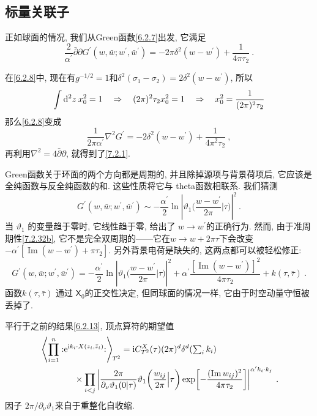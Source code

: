 \subsection*{标量关联子} 
正如球面的情况, 我们从Green函数\eqref{6.2.7}出发, 它满足
\begin{equation}
	\frac{2}{\alpha^{\prime}} \bar{\partial} \partial G^{\prime}(w, \bar{w} ; w^{\prime}, \bar{w}^{\prime})
	=-2 \pi \delta^{2}(w-w^{\prime})+\frac{1}{4 \pi \tau_{2}} \:. \label{7.2.1}
\end{equation}
\begin{tcolorbox}
	\begin{remark}
		在\eqref{6.2.8}中, 现在有$g^{-1/2}=1$和$ \delta^{2}(\sigma_{1}-\sigma_{2})=2 \delta^{2}(w-w^{\prime})$, 所以
		\[
			\int \mathrm{d}^{2} z\: x_{0}^{2}=1 \quad \Rightarrow \quad (2 \pi)^{2} \tau_{2} x_{0}^{2}=1 \quad \Rightarrow \quad 
			 x_{0}^{2}=\frac{1}{(2 \pi)^{2} \tau_{2}}
		\]
		那么\eqref{6.2.8}变成
		\[
			\frac{1}{2 \pi \alpha^{\prime}} \nabla^{2} G^{\prime} =-2 \delta^{2}(w-w^{\prime})+\frac{1}{4 \pi^{2} \tau_{2}} \:,
		\]
		再利用$\nabla^{2}=4\bar{\partial} \partial$, 就得到了\eqref{7.2.1}.
	\end{remark}
\end{tcolorbox}
\noindent Green函数关于环面的两个方向都是周期的, 并且除掉源项与背景荷项后, 它应该是全纯函数与反全纯函数的和. 这些性质将它与 theta函数相联系. 我们猜测 
\begin{equation}
	G^{\prime}(w, \bar{w} ; w^{\prime}, \bar{w}^{\prime}) \sim-\frac{\alpha^{\prime}}{2}
	\ln \left|\vartheta_{1}\biggl(\frac{w-w^{\prime}}{2 \pi} \Big\vert \tau\biggr)\right|^{2} \:. \label{7.2.2}
\end{equation}
当 $\vartheta_{1}$ 的变量趋于零时, 它线性趋于零, 给出了 $w \rightarrow w^{\prime} $的正确行为. 
然而, 由于准周期性\eqref{7.2.32b}, 它不是完全双周期的——它在$w \rightarrow w+2 \pi \tau$下会改变
$-\alpha^{\prime}[\operatorname{Im}(w-w^{\prime})+\pi \tau_{2}]$. 另外背景电荷是缺失的, 这两点都可以被轻松修正:
\begin{equation}
	G^{\prime}(w, \bar{w} ; w^{\prime}, \bar{w}^{\prime} ) = -\frac{\alpha^{\prime}}{2} 
	\ln \left|\vartheta_{1}\biggl(\frac{w-w^{\prime}}{2 \pi} \Big\vert \tau\biggr)\right|^{2}+
	\alpha^{\prime} \frac{[\operatorname{Im}(w-w^{\prime})]^{2}}{4 \pi \tau_{2}}+k(\tau, \bar{\tau}) \:. \label{7.2.3}
\end{equation}
函数$k(\tau, \bar{\tau})$ 通过 $\mathsf{X}_{0}$的正交性决定, 但同球面的情况一样, 它由于时空动量守恒被丢掉了. 

平行于之前的结果\eqref{6.2.13}, 顶点算符的期望值
\begin{align}
	& \left\langle\prod_{i=1}^{n}: \mathrel{\mathrm{e}^{\mathrm{i} k_{i} \cdot X(z_{i}, \bar{z}_{i})}}:\right\rangle \bigg._{\!\!T^{2}} 
	=\mathrm{i} C_{T^{2}}^{X}(\tau)(2 \pi)^{d} \delta^{d}({\textstyle \sum_{i} k_{i}}) \nonumber \\
	&\qquad \qquad  \times \prod_{i<j}\left|\frac{2 \pi}{\partial_{\nu} \vartheta_{1}(0 \vert \tau)} 
	\vartheta_{1}\biggl(\frac{w_{i j}}{2 \pi} \Big\vert \tau\biggr) \exp 
	\biggl[-\frac{(\operatorname{Im} w_{i j})^{2}}{4 \pi \tau_{2}}\biggr]\right|^{\alpha^{\prime} k_{i} \cdot k_{j}} \:. \label{7.2.4}
\end{align}
因子 $2 \pi / \partial_{\nu} \vartheta_{1}$来自于重整化自收缩.

